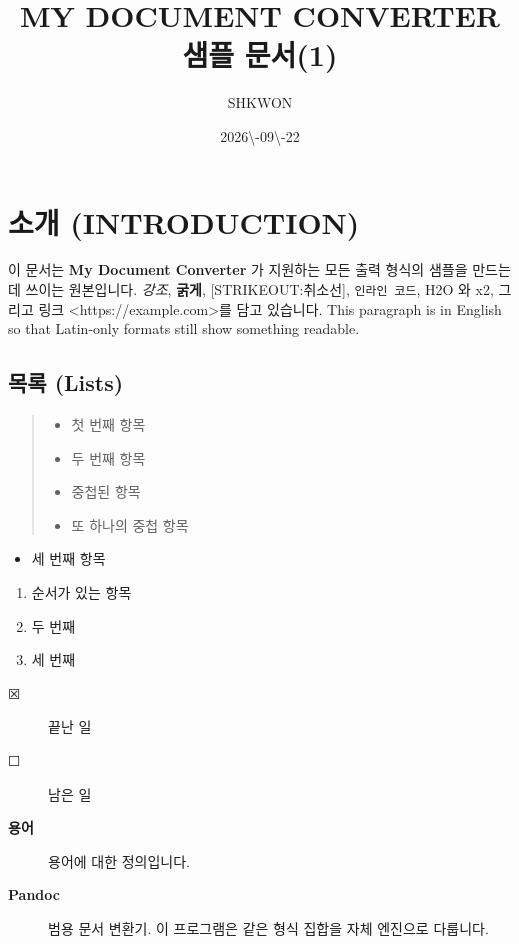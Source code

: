 \documentclass[11pt]{article}
\title{MY DOCUMENT CONVERTER 샘플 문서(1)}
\author{SHKWON}
\date{2026\textbackslash{}-09\textbackslash{}-22}
\begin{document}
\maketitle

\section*{소개 (INTRODUCTION)}\label{소개-introduction}

이 문서는 \textbf{My Document Converter} 가 지원하는 모든 출력 형식의 샘플을 만드는 데 쓰이는
원본입니다.
\emph{강조}, \textbf{굵게}, [STRIKEOUT:취소선], \verb|인라인 코드|,
H2O 와 x2, 그리고 링크 <https://example.com>를 담고
있습니다.
This paragraph is in English so that Latin-only formats still show
something readable.

\subsection*{목록 (Lists)}\label{목록-lists}

\begin{quote}
\begin{itemize}
\item 첫 번째 항목
\item 두 번째 항목
\item 중첩된 항목
\item 또 하나의 중첩 항목
\end{itemize}
\end{quote}

\begin{itemize}
\item 세 번째 항목
\end{itemize}

\begin{enumerate}
\item 순서가 있는 항목
\item 두 번째
\item 세 번째
\end{enumerate}

\begin{description}
\item[☒] 끝난 일
\end{description}

\begin{description}
\item[☐] 남은 일
\item[\textbf{용어}] 용어에 대한 정의입니다.
\item[\textbf{Pandoc}] 범용 문서 변환기. 이 프로그램은 같은 형식 집합을 자체 엔진으로 다룹니다.
\end{description}
\end{document}

